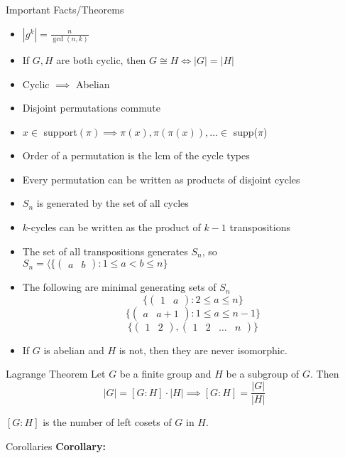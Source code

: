 \documentclass{article}
\begin{document}
\begin{multicols*}{3}
\begin{blackbox}{Important Facts/Theorems}
\begin{itemize}
        \item $|g^k| = \frac{n}{\gcd(n,k)}$
        \item If $G,H$ are both cyclic, then $G \cong H \iff |G| = |H|$
        \item Cyclic $\implies$ Abelian
        \item Disjoint permutations commute
        \item $x \in $ support$(\pi) \implies \pi(x), \pi(\pi(x)), \ldots \in$ supp($\pi$)
        \item Order of a permutation is the lcm of the cycle types
        \item Every permutation can be written as products of disjoint cycles
        \item $S_n$ is generated by the set of all cycles
        \item $k$-cycles can be written as the product of $k - 1$ transpositions
        \item The set of all transpositions generates $S_n$, so $S_n = \langle \{\begin{pmatrix}
            a & b
        \end{pmatrix}: 1 \leq a < b \leq n\}$
        \item The following are minimal generating sets of $S_n$
        \[\{\begin{pmatrix}
            1 & a
        \end{pmatrix}: 2 \leq a \leq n\}\]
        \[\{\begin{pmatrix}
            a & a+1
        \end{pmatrix}: 1 \leq a \leq n-1\}\]
        \[\{\begin{pmatrix}
            1 & 2
        \end{pmatrix}, \begin{pmatrix}
            1 & 2 & \ldots & n
        \end{pmatrix}\}\]
        \item If $G$ is abelian and $H$ is not, then they are never isomorphic.
    \end{itemize}
\end{blackbox}
\begin{blackbox}{Lagrange Theorem}
    Let $G$ be a finite group and $H$ be a subgroup of $G$. Then\\[-2ex]
    \[|G| = [G : H] \cdot |H| \implies [G:H] = \frac{|G|}{|H|}\]
    \raggedright
    $[G:H]$ is the number of left cosets of $G$ in $H$.
    \begin{bluebox}{Corollaries}
        \textbf{Corollary:}\\[-2ex]

\end{bluebox}
\end{blackbox}
\end{multicols*}
\end{document}
